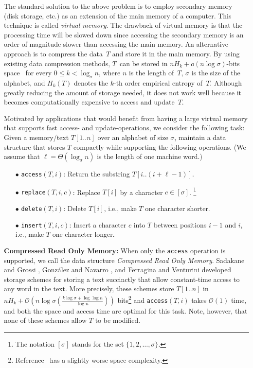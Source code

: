 \documentclass{llncs}
\newcommand{\Order}{\mathcal{O}}
\newcommand{\order}{o}
\begin{document}
The standard solution to the above problem is to employ secondary memory
(disk storage, etc.) as an extension of the main memory of a computer.
This technique is called \emph{virtual memory}.
The drawback of virtual memory is that the processing time will be slowed
down since accessing the secondary memory is an order of magnitude slower
than accessing the main memory.
An alternative approach is to compress the data~$T$ and store it in the main
memory.
By using existing data compression methods, $T$~can be stored in
$n H_k + \order(n \log \sigma)$-bits space~\cite{FerMan05,GGV03}
for every $0 \le k < \log_\sigma n$,
where $n$ is the length of~$T$, $\sigma$ is the size of the alphabet,
and $H_k(T)$ denotes the $k$-th order empirical entropy of~$T$.
Although greatly reducing the amount of storage needed, it does not work well
because it becomes computationally expensive to access and update~$T$.

Motivated by applications that would benefit from having a large virtual
memory that supports fast access- and update-operations, we consider
the following task:
Given a memory/text $T[1..n]$ over an alphabet of size $\sigma$, maintain
a data structure that stores $T$ compactly while supporting the following
operations.
(We assume that $\ell = \Theta(\log_\sigma n)$ is the length of one machine
word.)
\begin{itemize}
\vspace*{-1mm}
\item[{\raise0.3pt\hbox{$\bullet$}}]
  \textnormal{\texttt{access}}$(T,i)$:
  Return the substring $T[i..(i+\ell-1)]$.
\item[{\raise0.3pt\hbox{$\bullet$}}]
  \textnormal{\texttt{replace}}$(T,i,c)$:
  Replace $T[i]$ by a character $c \in [\sigma]$.
  \footnote{The notation $[\sigma]$ stands for the
  set $\{1,2,\ldots,\sigma\}$.}
\item[{\raise0.3pt\hbox{$\bullet$}}]
  \textnormal{\texttt{delete}}$(T,i)$:
  Delete $T[i]$,
  i.e., make $T$ one character shorter.
\item[{\raise0.3pt\hbox{$\bullet$}}]
  \textnormal{\texttt{insert}}$(T,i,c)$:
  Insert a character $c$ into $T$ between
positions $i-1$ and $i$,
  i.e., make $T$ one character longer.
\end{itemize}

\noindent
\textbf{Compressed Read Only Memory:}
When only the \texttt{access} operation is supported,
we call the data structure \emph{Compressed Read Only Memory}.
Sadakane and Grossi \cite{SG_SODA2006},
Gonz\'alez and Navarro \cite{GonzalezN06}, and
Ferragina and Venturini \cite{FerVen07b}
developed storage schemes for storing a text succinctly that
allow constant-time access to any word in the text.
More precisely, these schemes store $T[1..n]$ in
$nH_k + \Order\left(n \log \sigma \left(\frac{k \log \sigma + \log \log n}{\log n}\right)\right)$ bits\footnote{Reference~\cite{SG_SODA2006} has
a slightly worse space complexity.}
and \texttt{access}$(T,i)$ takes $\Order(1)$ time,
and both the space and access time are optimal for this task.
Note, however, that none of these schemes allow $T$ to be modified.
\end{document}
